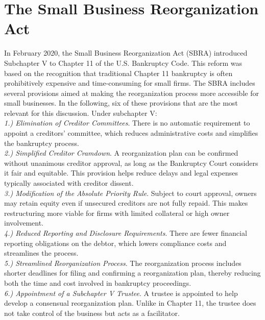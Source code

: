 \documentclass[12pt]{article}
\begin{document}
\section{The Small Business Reorganization Act}
In February 2020, the Small Business Reorganization Act (SBRA) introduced Subchapter V to Chapter 11 of the U.S. Bankruptcy Code. This reform was based on the recognition that traditional Chapter 11 bankruptcy is often prohibitively expensive and time-consuming for small firms. The SBRA includes several provisions aimed at making the reorganization process more accessible for small businesses. In the following, six of these provisions that are the most relevant for this discussion. Under subchapter V: \vspace{3mm} \\
\textit{1.) Elimination of Creditor Committees}. There is no automatic requirement to appoint a creditors' committee, which reduces administrative costs and simplifies the bankruptcy process. \vspace{3mm} \\
\textit{2.) Simplified Creditor Cramdown}. A reorganization plan can be confirmed without unanimous creditor approval, as long as the Bankruptcy Court considers it fair and equitable. This provision helps reduce delays and legal expenses typically associated with creditor dissent. \vspace{3mm} \\
\textit{3.) Modification of the Absolute Priority Rule}. Subject to court approval, owners may retain equity even if unsecured creditors are not fully repaid. This makes restructuring more viable for firms with limited collateral or high owner involvement. \vspace{3mm} \\
\textit{4.) Reduced Reporting and Disclosure Requirements}. There are fewer financial reporting obligations on the debtor, which lowers compliance costs and streamlines the process. \vspace{3mm} \\
\textit{5.) Streamlined Reorganization Process}. The reorganization process includes shorter deadlines for filing and confirming a reorganization plan, thereby reducing both the time and cost involved in bankruptcy proceedings. \vspace{3mm} \\
\textit{6.) Appointment of a Subchapter V Trustee}. A trustee is appointed to help develop a consensual reorganization plan. Unlike in Chapter 11, the trustee does not take control of the business but acts as a facilitator. \vspace{3mm} \\
\end{document}
